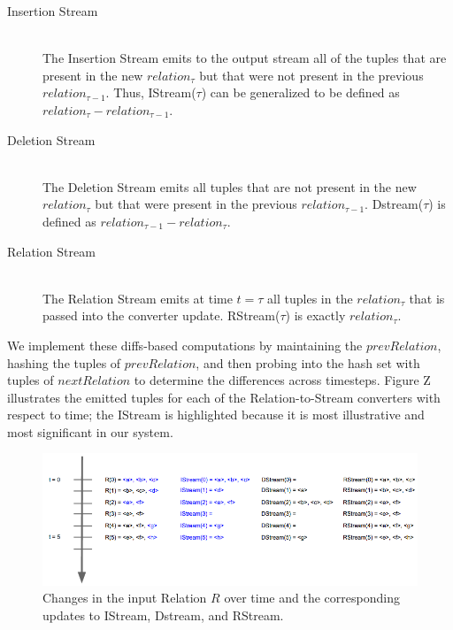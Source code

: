 \documentclass[a4paper, 10pt, conference]{IEEEconf}
\begin{document}
\begin{description}
    \item[Insertion Stream] \hfill \\
    The Insertion Stream emits to the output stream all of the tuples that are present in the new $relation_{\tau}$ but that were not present in the previous $relation_{\tau - 1}$. Thus, IStream($\tau$) can be generalized to be defined as $relation_{\tau} -relation_{\tau - 1}$.

    \item[Deletion Stream] \hfill \\
    The Deletion Stream emits all tuples that are not present in the new $relation_{\tau}$ but that were present in the previous $relation_{\tau - 1}$. Dstream($\tau$) is defined as $relation_{\tau - 1} - relation_{\tau}$.

    \item[Relation Stream] \hfill \\
    The Relation Stream emits at time $t = \tau$ all tuples in the $relation_{\tau}$ that is passed into the converter update. RStream($\tau$) is exactly $relation_{\tau}$.

\end{description}


We implement these diffs-based computations by maintaining the $prevRelation$, hashing the tuples of $prevRelation$, and then probing into the hash set with tuples of $nextRelation$ to determine the differences across timesteps. Figure Z illustrates the emitted tuples for each of the Relation-to-Stream converters with respect to time; the IStream is highlighted because it is most illustrative and most significant in our system. 

\begin{figure}[h!]
    \centering
    \centerline{\includegraphics[totalheight=3cm]{stream_converter.png}}
    \caption{Changes in the input Relation $R$ over time and the corresponding updates to IStream, Dstream, and RStream.}
    \label{fig:stream_converter}
\end{figure}
\end{document}
